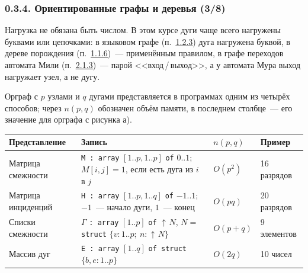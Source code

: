 \documentclass[mathserif,12pt,aspectratio=169]{beamer}
\def\Pointer{\operatorname{\uparrow\!}}
\def\DMref#1#2{{\color{blue}\underline{\hyperlink{#2}{#1}}}}
\begin{document}
\begin{frame}
\frametitle{0.3.4. Ориентированные графы и деревья (3/8)}

\begin{remark}
Нагрузка не обязана быть числом. В этом курсе дуги чаще всего нагружены буквами
или цепочками: в языковом графе (п.~\DMref{1.2.3}{1.2.3.}) дуга нагружена буквой,
в дереве порождения (п.~\DMref{1.1.6}{1.1.6.})~--- применённым правилом, в графе
переходов автомата Мили (п.~\DMref{2.1.3}{2.1.3.})~--- парой <<вход\,/\,выход>>, а
у автомата Мура выход нагружает узел, а не дугу.
\end{remark}

Орграф с $p$ узлами и $q$ дугами представляется в программах одним из четырёх
способов; через $n(p,q)$ обозначен объём памяти, в последнем столбце~--- его
значение для орграфа с рисунка а).

\vspace{-2pt}
\begin{center}\scriptsize
\begin{tabular}{|l|p{6.6cm}|l|l|}
\hline
Представление & Запись & $n(p,q)$ & Пример \\
\hline
Матрица смежности & \texttt{M : array} $[1..p,1..p]$ \texttt{of} $0..1$;
$M[i,j]=1$, если есть дуга из $i$ в $j$ & $O(p^2)$ & 16 разрядов \\
Матрица инциденций & \texttt{H : array} $[1..p,1..q]$ \texttt{of} $-1..1$;
$-1$~--- начало дуги, $1$~--- конец & $O(pq)$ & 20 разрядов \\
Списки смежности & $\Gamma$ \texttt{: array} $[1..p]$ \texttt{of} $\Pointer N$,
$N=$ \texttt{struct} $\{v:1..p;\ n:\Pointer N\}$ & $O(p+q)$ & 9 элементов \\
Массив дуг & \texttt{E : array} $[1..q]$ \texttt{of struct} $\{b,e:1..p\}$ &
$O(2q)$ & 10 чисел \\
\hline
\end{tabular}
\end{center}
\end{frame}
\end{document}
